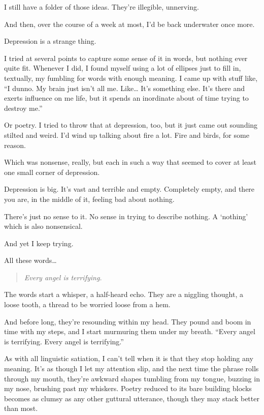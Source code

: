I still have a folder of those ideas. They're illegible, unnerving.

And then, over the course of a week at most, I'd be back underwater once more.

Depression is a strange thing.

I tried at several points to capture some sense of it in words, but nothing ever quite fit. Whenever I did, I found myself using a lot of ellipses just to fill in, textually, my fumbling for words with enough meaning. I came up with stuff like, ``I dunno. My brain just isn't all me. Like\ldots{} It's something else. It's there and exerts influence on me life, but it spends an inordinate about of time trying to destroy me.''

Or poetry. I tried to throw that at depression, too, but it just came out sounding stilted and weird. I'd wind up talking about fire a lot. Fire and birds, for some reason.

Which was nonsense, really, but each in such a way that seemed to cover at least one small corner of depression.

Depression is big. It's vast and terrible and empty. Completely empty, and there you are, in the middle of it, feeling bad about nothing.

There's just no sense to it. No sense in trying to describe nothing. A `nothing' which is also nonsensical.

And yet I keep trying.

All these words\ldots{}

\secdiv{}

\begin{verse}
\emph{Every angel is terrifying.}
\end{verse}

The words start a whisper, a half-heard echo. They are a niggling thought, a loose tooth, a thread to be worried loose from a hem.

And before long, they're resounding within my head. They pound and boom in time with my steps, and I start murmuring them under my breath. ``Every angel is terrifying. Every angel is terrifying.''

As with all linguistic satiation, I can't tell when it is that they stop holding any meaning. It's as though I let my attention slip, and the next time the phrase rolls through my mouth, they're awkward shapes tumbling from my tongue, buzzing in my nose, brushing past my whiskers. Poetry reduced to its bare building blocks becomes as clumsy as any other guttural utterance, though they may stack better than most.

